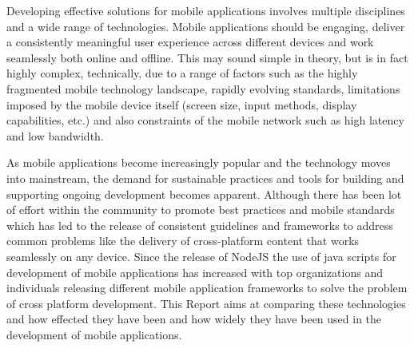\documentclass[12pt]{extreport}
\begin{document}
Developing effective solutions for mobile applications involves multiple disciplines and a wide range of technologies. Mobile applications should be engaging, deliver a consistently meaningful user experience across different devices and work seamlessly both online and offline. This may sound simple in theory, but is in fact highly complex, technically, due to a range of factors such as the highly fragmented mobile technology landscape, rapidly evolving standards, limitations imposed by the mobile device itself (screen size, input methods, display capabilities, etc.) and also constraints of the mobile network such as high latency and low bandwidth.

As mobile applications become increasingly popular and the technology moves into mainstream, the demand for sustainable practices and tools for building and supporting ongoing development becomes apparent. Although there has been lot of effort within the community to promote best practices and mobile standards which has led to the release of consistent guidelines and frameworks to address common problems like the delivery of cross-platform content that works seamlessly on any device. 
Since the release of NodeJS the use of java scripts for development of mobile applications has increased with top organizations and individuals releasing different mobile application frameworks to solve the problem of cross platform development. 
This Report aims at comparing these technologies and how effected they have been and how widely they have been used in the development of mobile applications.

\newpage
\end{document}
